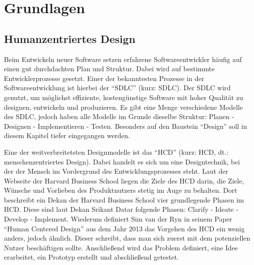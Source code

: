 
\chapter{Grundlagen}
\label{chapter:3}


\section{Humanzentriertes Design}

Beim Entwickeln neuer Software setzen erfahrene Softwareentwickler häufig auf einen gut durchdachten Plan und Struktur. Dabei wird auf bestimmte Entwicklerprozesse gesetzt. Einer der bekanntesten Prozesse in der Softwareentwicklung ist hierbei der “\acl{SDLC}” (kurz: \acs{SDLC}). Der \acs{SDLC} wird genutzt, um möglichst effiziente, kostengünstige Software mit hoher Qualität zu designen, entwickeln und produzieren.\cite{shylesh:2017} Es gibt eine Menge verschiedene Modelle des \acs{SDLC}, jedoch haben alle Modelle im Grunde dieselbe Struktur: Planen - Designen - Implementieren - Testen. Besonders auf den Baustein “Design” soll in diesem Kapitel tiefer eingegangen werden.

Eine der weitverbreitetsten Designmodelle ist das “\acl{HCD}” (kurz: \acs{HCD}, dt.: menschenzentriertes Design).  Dabei handelt es sich um eine Designtechnik, bei der der Mensch im Vordergrund des Entwicklungsprozesses steht.\cite{hbsc:2020} Laut der Webseite der Harvard Business School liegen die Ziele des \acs{HCD} darin, die Ziele, Wünsche und Vorlieben des Produktnutzers stetig im Auge zu behalten.\cite{hbsc:2020} Dort beschreibt ein Dekan der Harvard Business School vier grundlegende Phasen im \acs{HCD}. Diese sind laut Dekan Srikant Datar folgende Phasen: Clarify - Ideate - Develop - Implement.\cite{hbsc:2020} Wiederum definiert Sim van der Ryn in seinem Paper “Human Centered Design” aus dem Jahr 2013 das Vorgehen des \acs{HCD} ein wenig anders, jedoch ähnlich. Dieser schreibt, dass man sich zuerst mit dem potenziellen Nutzer beschäftigen sollte.\cite{vanderryn:2013} Anschließend wird das Problem definiert, eine Idee erarbeitet, ein Prototyp erstellt und abschließend getestet.\cite{vanderryn:2013}

